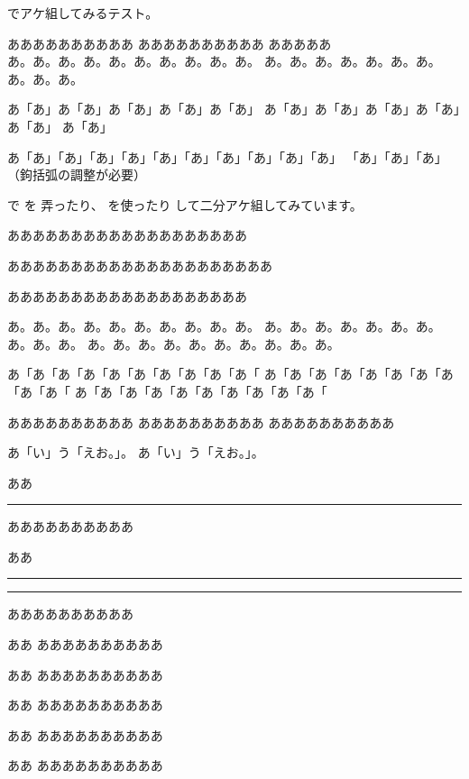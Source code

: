 \documentclass[12pt,landscape]{ltjtarticle}
\begin{document}

でアケ組してみるテスト。

ああああああああああ
あああああああああ\allowbreak あ
あああああ\\
あ。あ。あ。あ。あ。あ。あ。あ。あ。あ。
あ。あ。あ。あ。あ。あ。あ。あ。あ。あ。

あ「あ」あ「あ」あ「あ」あ「あ」あ「あ」
あ「あ」あ「あ」あ「あ」あ「あ」あ「あ」
あ「あ」

あ「あ」「あ」「あ」「あ」「あ」「あ」「あ」「あ」「あ」「あ」
「あ」「あ」「あ」（鉤括弧の調整が必要）

で
を
弄ったり、
を使ったり
して二分アケ組してみています。

あああああああああああああああああああ

あああああああああああああああああああああ

あああああああああああああああああああ

%
あ。あ。あ。あ。あ。あ。あ。あ。あ。あ。%
あ。あ。あ。あ。あ。あ。あ。あ。あ。あ。%
あ。あ。あ。あ。あ。あ。あ。あ。あ。あ。%

あ「あ「あ「あ「あ「あ「あ「あ「あ「あ「%
あ「あ「あ「あ「あ「あ「あ「あ「あ「あ「%
あ「あ「あ「あ「あ「あ「あ「あ「あ「あ「%


ああああああああああ%
ああああああああああ%
ああああああああああ%

あ「い」う「えお。」。
あ「い」う「えお。」。

ああ\rule{\zw}{1pt}%
ああああああああああ

ああ\rule{\intcalcShr{\zw} sp}{1pt}\rule{\intcalcSub{\zw}{\intcalcShr{\zw}} sp}{1pt}%
ああああああああああ

ああ\sibuNoalign{}%
ああああああああああ

ああ%
ああああああああああ

ああ%
ああああああああああ

ああ%
ああああああああああ

ああ%
ああああああああああ
\end{document}
